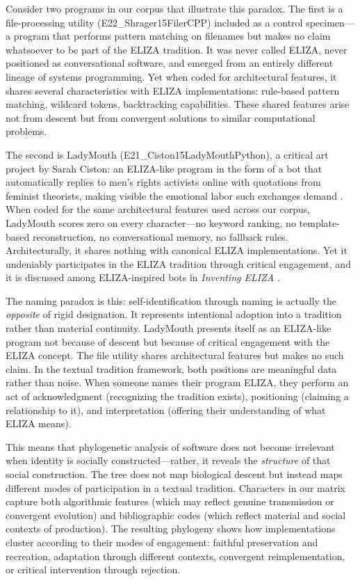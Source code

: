 \documentclass{article}
\begin{document}
Consider two programs in our corpus that illustrate this paradox. The first is a file-processing utility (E22\_Shrager15FilerCPP) included as a control specimen—a program that performs pattern matching on filenames but makes no claim whatsoever to be part of the ELIZA tradition. It was never called ELIZA, never positioned as conversational software, and emerged from an entirely different lineage of systems programming. Yet when coded for architectural features, it shares several characteristics with ELIZA implementations: rule-based pattern matching, wildcard tokens, backtracking capabilities. These shared features arise not from descent but from convergent solutions to similar computational problems.

The second is LadyMouth (E21\_Ciston15LadyMouthPython), a critical art project by Sarah Ciston: an ELIZA-like program in the form of a bot that automatically replies to men's rights activists online with quotations from feminist theorists, making visible the emotional labor such exchanges demand \cite{ciston2019ladymouth}. When coded for the same architectural features used across our corpus, LadyMouth scores zero on every character—no keyword ranking, no template-based reconstruction, no conversational memory, no fallback rules. Architecturally, it shares nothing with canonical ELIZA implementations. Yet it undeniably participates in the ELIZA tradition through critical engagement, and it is discussed among ELIZA-inspired bots in \textit{Inventing ELIZA} \cite{ciston2026inventing}.

The naming paradox is this: self-identification through naming is actually the \emph{opposite} of rigid designation. It represents intentional adoption into a tradition rather than material continuity. LadyMouth presents itself as an ELIZA-like program not because of descent but because of critical engagement with the ELIZA concept. The file utility shares architectural features but makes no such claim. In the textual tradition framework, both positions are meaningful data rather than noise. When someone names their program ELIZA, they perform an act of acknowledgment (recognizing the tradition exists), positioning (claiming a relationship to it), and interpretation (offering their understanding of what ELIZA means).

This means that phylogenetic analysis of software does not become irrelevant when identity is socially constructed—rather, it reveals the \emph{structure} of that social construction. The tree does not map biological descent but instead maps different modes of participation in a textual tradition. Characters in our matrix capture both algorithmic features (which may reflect genuine transmission or convergent evolution) and bibliographic codes (which reflect material and social contexts of production). The resulting phylogeny shows how implementations cluster according to their modes of engagement: faithful preservation and recreation, adaptation through different contexts, convergent reimplementation, or critical intervention through rejection.
\end{document}
